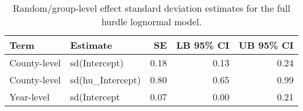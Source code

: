 \documentclass[
  letterpaper,
  DIV=11,
  numbers=noendperiod]{scrartcl}
\begin{document}
\hypertarget{tbl-brms2-re}{}
\begin{table}
\caption{\label{tbl-brms2-re}Random/group-level effect standard deviation estimates for the full
hurdle lognormal model. }\tabularnewline

\centering
\begin{tabular}{llrrr}
\toprule
Term & Estimate & SE & LB 95\% CI & UB 95\% CI\\
\midrule
County-level & sd(Intercept) & 0.18 & 0.13 & 0.24\\
County-level & sd(hu\_Intercept) & 0.80 & 0.65 & 0.99\\
Year-level & sd(Intercept & 0.07 & 0.00 & 0.21\\
\bottomrule
\end{tabular}
\end{table}
\end{document}
